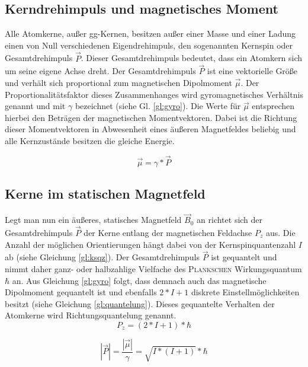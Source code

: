 \subsection*{Kerndrehimpuls und magnetisches Moment}
Alle Atomkerne, außer gg-Kernen, besitzen außer einer Masse und einer Ladung einen von Null verschiedenen Eigendrehimpuls, den sogenannten Kernspin oder Gesamtdrehimpuls $\overrightarrow{P}$. Dieser Gesamtdrehimpuls bedeutet, dass ein Atomkern sich um seine eigene Achse dreht. Der Gesamtdrehimpuls $\overrightarrow{P}$ ist eine vektorielle Größe und verhält sich proportional zum magnetischen Dipolmoment $\overrightarrow{\mu}$. Der Proportionalitätsfaktor dieses Zusammenhanges wird gyromagnetisches Verhältnis genannt und mit $\gamma$ bezeichnet (siehe Gl. \ref{gl:gyro}). Die Werte für $\overrightarrow{\mu}$ entsprechen hierbei den Beträgen der magnetischen Momentvektoren. Dabei ist die Richtung dieser Momentvektoren in Abwesenheit eines äußeren Magnetfeldes beliebig und alle Kernzustände besitzen die gleiche Energie.

\begin{equation}
\label{gl:gyro}
	\overrightarrow{\mu} = \gamma*\overrightarrow{P}
\end{equation}

\subsection*{Kerne im statischen Magnetfeld}
Legt man nun ein äußeres, statisches Magnetfeld $\overrightarrow{B}_0$ an richtet sich der Gesamtdrehimpuls $\overrightarrow{P}$ der Kerne entlang der magnetischen Feldachse $P_z$ aus. Die Anzahl der möglichen Orientierungen hängt dabei von der Kernspinquantenzahl $I$ ab (siehe Gleichung \ref{gl:ksqz}). Der Gesamtdrehimpuls $\overrightarrow{P}$ ist gequantelt und nimmt daher ganz- oder halbzahlige Vielfache des \textsc{Plankschen} Wirkungsquantum $\hbar$ an. Aus Gleichung \ref{gl:gyro} folgt, dass demnach auch das magnetische Dipolmoment gequantelt ist und ebenfalls $2*I+1$ diskrete Einstellmöglichkeiten besitzt (siehe Gleichung \ref{gl:quantelung}).
Dieses gequantelte Verhalten der Atomkerne wird Richtungsquantelung genannt.
\begin{equation}
\label{gl:ksqz}	
	P_z = \left(2*I+1\right)*\hbar
\end{equation}

\begin{equation}
	\label{gl:quantelung}	
	\left| \overrightarrow{P} \right| = \frac{	\left| \overrightarrow{\mu} \right|}{\gamma} = \sqrt{I*\left(I+1\right)}*\hbar
\end{equation}

